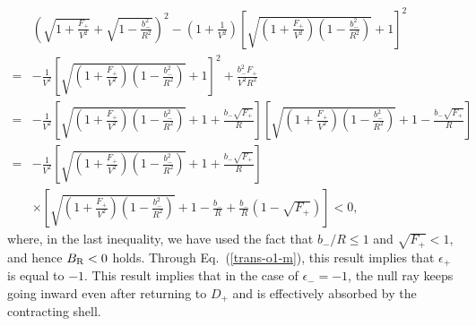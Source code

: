 \documentclass[aps,preprint,preprintnumber,nofootinbib,amsmath,amssymb,ascmac,bm,12pt]{revtex4}
\newcommand{\bmi}{b_-}
\begin{document}
\begin{align}
&\left(\sqrt{1+\frac{F_+}{V^2}}+\sqrt{1-\frac{\bmi^2}{R^2}}\right)^2
-\left(1+\frac{1}{V^2}\right)
\left[\sqrt{\left(1+\frac{F_+}{V^2}\right)\left(1-\frac{\bmi^2}{R^2}\right)}+1\right]^2 \nonumber \\
=&
-\frac{1}{V^2}\left[\sqrt{\left(1+\frac{F_+}{V^2}\right)\left(1-\frac{\bmi^2}{R^2}\right)}+1\right]^2
+\frac{\bmi^2F_+}{V^2R^2}
\nonumber \\
=&-\frac{1}{V^2}
\left[\sqrt{\left(1+\frac{F_+}{V^2}\right)\left(1-\frac{\bmi^2}{R^2}\right)}+1+\frac{\bmi\sqrt{F_+}}{R}\right] 
\left[\sqrt{\left(1+\frac{F_+}{V^2}\right)\left(1-\frac{\bmi^2}{R^2}\right)}+1
-\frac{\bmi\sqrt{F_+}}{R}\right] \nonumber \\
=&-\frac{1}{V^2}
\left[\sqrt{\left(1+\frac{F_+}{V^2}\right)\left(1-\frac{\bmi^2}{R^2}\right)}+1
+\frac{\bmi\sqrt{F_+}}{R}\right] \nonumber \\
&\times\left[\sqrt{\left(1+\frac{F_+}{V^2}\right)\left(1-\frac{\bmi^2}{R^2}\right)}+1
-\frac{\bmi}{R}+\frac{\bmi}{R}\left(1-\sqrt{F_+}\right)\right]<0,
\end{align}
where, in the last inequality, we have used the fact that $\bmi/R\leq1$ and $\sqrt{F_+}<1$, and  
hence $B_{\rm R}<0$ holds. Through Eq.~(\ref{trans-o1-m}), this result implies 
that $\epsilon_+$ is equal to $-1$. This result implies that in the case of $\epsilon_-=-1$, 
the null ray keeps going inward even after returning to $D_+$ and is effectively absorbed 
by the contracting shell. 
 
\end{document}
